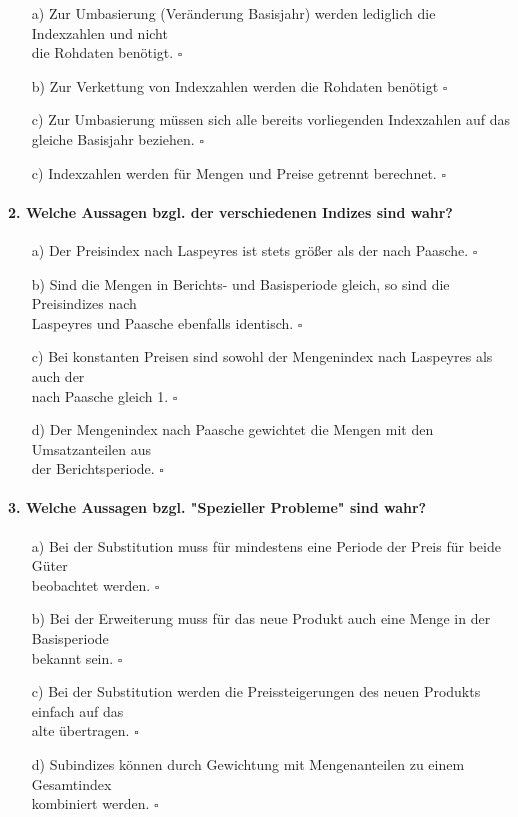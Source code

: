 \documentclass[a4paper]{article}
\begin{document}
\begin{itemize}
    \item[a)] Zur Umbasierung (Veränderung Basisjahr) werden lediglich die Indexzahlen und nicht\\die Rohdaten benötigt. \hfill $\square$
    \item[b)] Zur Verkettung von Indexzahlen werden die Rohdaten benötigt \hfill $\square$
    \item[c)] Zur Umbasierung müssen sich alle bereits vorliegenden Indexzahlen auf das\\gleiche Basisjahr beziehen. \hfill $\square$
    \item[c)] Indexzahlen werden für Mengen und Preise getrennt berechnet. \hfill $\square$
\end{itemize}

\paragraph{2. Welche Aussagen bzgl. der verschiedenen Indizes sind wahr?}

\begin{itemize}
    \item[a)] Der Preisindex nach Laspeyres ist stets größer als der nach Paasche. \hfill $\square$
    \item[b)] Sind die Mengen in Berichts- und Basisperiode gleich, so sind die Preisindizes nach\\Laspeyres und Paasche ebenfalls identisch. \hfill $\square$
    \item[c)] Bei konstanten Preisen sind sowohl der Mengenindex nach Laspeyres als auch der\\nach Paasche gleich 1. \hfill $\square$
    \item[d)] Der Mengenindex nach Paasche gewichtet die Mengen mit den Umsatzanteilen aus\\der Berichtsperiode. \hfill $\square$
\end{itemize}

\paragraph{3. Welche Aussagen bzgl. "Spezieller Probleme" sind wahr?}

\begin{itemize}
    \item[a)] Bei der Substitution muss für mindestens eine Periode der Preis für beide Güter\\beobachtet werden. \hfill $\square$
    \item[b)] Bei der Erweiterung muss für das neue Produkt auch eine Menge in der Basisperiode\\bekannt sein. \hfill $\square$
    \item[c)] Bei der Substitution werden die Preissteigerungen des neuen Produkts einfach auf das\\alte übertragen. \hfill $\square$
    \item[d)] Subindizes können durch Gewichtung mit Mengenanteilen zu einem Gesamtindex\\kombiniert werden. \hfill $\square$
\end{itemize}
\end{document}

